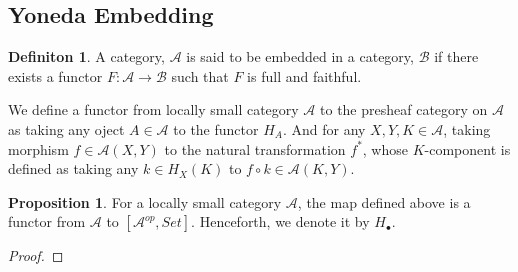 \documentclass[18pt,a4paper]{article}
\theoremstyle{definition}
\newtheorem{definition}[theorem]{Definiton}
\newtheorem{proop}[theorem]{Proposition}
\begin{document}
\subsection{Yoneda Embedding}%
\begin{definition} %
	A category, $\mathcal{A}$  is said to be embedded in a category, $\mathcal{B}$ if there exists a
	functor $F: \mathcal{A} \to \mathcal{B} $ such that $F$ is full and faithful.
\end{definition} %

We define a functor from locally small category $\mathcal{A}$ to the presheaf category on
$\mathcal{A} $ as taking any oject $A \in \mathcal{A} $ to the functor $H_A$.
And for any $X,Y,K \in \mathcal{A}$, taking morphism $f\in \mathcal{A} (X,Y)$
to the natural transformation $f^*$, whose $K$-component is defined as taking any $k \in H_X(K)$
to $f \circ k \in \mathcal{A} (K,Y)$.

\begin{proop} For a locally small category $\mathcal{A} $, the map defined above is a functor
	from $\mathcal{A} $ to $[\mathcal{A} ^{op},Set]$. Henceforth, we denote it by $H_\bullet$.
\end{proop}
\begin{proof}

\end{proof}
\end{document}
